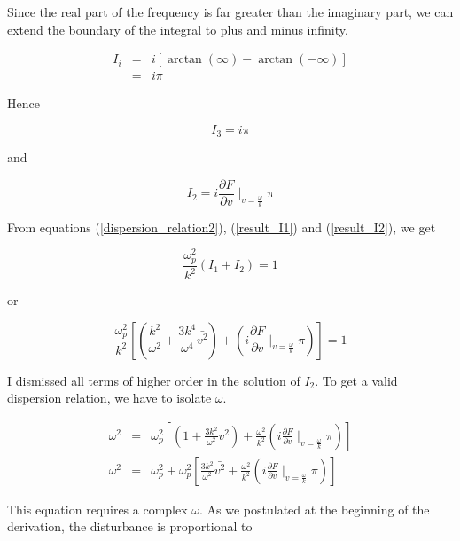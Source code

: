 \documentclass[a4paper,10pt]{report}
\begin{document}
Since the real part of the frequency is far greater than the imaginary part, we can extend the boundary of the integral to plus and minus infinity.

\begin{eqnarray}
    I_i&=& i \left[ \arctan {(\infty)} - \arctan {(-\infty)} \right]\\
&=& i \pi
\end{eqnarray}

Hence

\begin{equation}
    I_3=i \pi
\end{equation}

and

\begin{equation}\label{result_I2}
    I_2=i \frac{\partial F}{\partial v}\mid_{v=\frac{\omega}{k}} \pi
\end{equation}

From equations (\ref{dispersion_relation2}), (\ref{result_I1}) and (\ref{result_I2}), we get

\begin{equation}\label{dispersion_relation_solved}
 \frac{ \omega_p^2}{ k^2}  (I_1+I_2) =1
\end{equation}

or

\begin{equation}\label{dispersion_relation_solved_2}
 \frac{ \omega_p^2}{ k^2}  \left[ \left(\frac{k^2}{\omega^2}  + \frac{3 k^4}{\omega^4} \bar{v^2} \right)+ \left(i \frac{\partial F}{\partial v}\mid_{v=\frac{\omega}{k}} \pi \right) \right] =1
\end{equation}

I dismissed all terms of higher order in the solution of $I_2$. To get a valid dispersion relation, we have to isolate $\omega$.

\begin{eqnarray}
\omega^2 &=&  \omega_p^2  \left[ \left( 1  + \frac{3 k^2}{\omega^2} \bar{v^2} \right)+ \frac{\omega^2}{k^2}\left(i \frac{\partial F}{\partial v}\mid_{v=\frac{\omega}{k}} \pi \right) \right]\\
\omega^2 &=& \omega_p^2 + \omega_p^2 \left[ \frac{3 k^2}{\omega^2} \bar{v^2} + \frac{\omega^2}{k^2}\left(i \frac{\partial F}{\partial v}\mid_{v=\frac{\omega}{k}} \pi \right) \right]
\end{eqnarray}

This equation requires a complex $\omega$. As we postulated at the beginning of the derivation, the disturbance is proportional to
\end{document}
